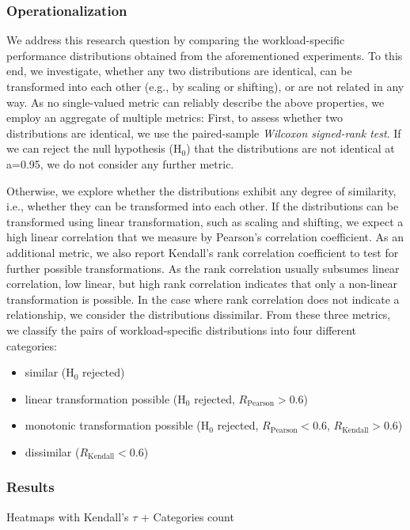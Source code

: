 
\subsubsection{Operationalization}
We address this research question by comparing the workload-specific performance distributions obtained from the aforementioned experiments. To this end, we investigate, whether any two distributions are identical, can be transformed into each other (e.g., by scaling or shifting), or are not related in any way. As no single-valued metric can reliably describe the above properties, we employ an aggregate of multiple metrics: First, to assess whether two distributions are identical, we use the paired-sample \emph{Wilcoxon signed-rank test}. If we can reject the null hypothesis ($\text{H}_0$) that the distributions are not identical at a=0.95, we do not consider any further metric. 

Otherwise, we explore whether the distributions exhibit any degree of similarity, i.e., whether they can be transformed into each other. If the distributions can be transformed using linear transformation, such as scaling and shifting, we expect a high linear correlation that we measure by Pearson’s correlation coefficient. As an additional metric, we also report Kendall’s rank correlation coefficient to test for further possible transformations. As the rank correlation usually subsumes linear correlation, low linear, but high rank correlation indicates that only a non-linear transformation is possible. In the case where rank correlation does not indicate a relationship, we consider the distributions dissimilar. From these three metrics, we classify the pairs of workload-specific distributions into four different categories:

\begin{itemize}
	\item similar ($\text{H}_0$ rejected)
	\item linear transformation possible ($\text{H}_0$ rejected, $R_\text{Pearson} > 0.6$)
	\item monotonic transformation possible ($\text{H}_0$ rejected, $R_\text{Pearson} < 0.6$, $R_\text{Kendall} > 0.6$)
	\item dissimilar ($R_\text{Kendall} < 0.6$)
\end{itemize}

\subsubsection{Results} {\color{red} Heatmaps with Kendall's $\tau$ + Categories count}

